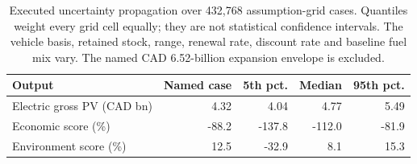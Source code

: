 \begin{table}[htbp]
\centering
\begin{tabular}{@{}lrrrr@{}}
\toprule
Output & Named case & 5th pct. & Median & 95th pct. \\
\midrule
Electric gross PV (CAD bn) & 4.32 & 4.04 & 4.77 & 5.49 \\
Economic score (\%) & -88.2 & -137.8 & -112.0 & -81.9 \\
Environment score (\%) & 12.5 & -32.9 & 8.1 & 15.3 \\
\bottomrule
\end{tabular}
\caption{Executed uncertainty propagation over 432,768 assumption-grid cases. Quantiles weight every grid cell equally; they are not statistical confidence intervals. The vehicle basis, retained stock, range, renewal rate, discount rate and baseline fuel mix vary. The named CAD 6.52-billion expansion envelope is excluded.}
\end{table}
